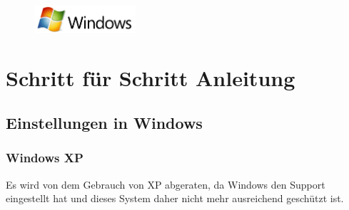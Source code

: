 \documentclass[a4paper,12pt]{scrartcl}
\begin{document}
\newpage
\enlargethispage{20pt}

\begin{figure}[t!]
    \raggedleft
    \vspace{-20pt}
    \includegraphics[height=1cm,keepaspectratio]{Bilder/Windows_logo}
    \vspace{-30pt}
\end{figure}

\section*{Schritt für Schritt Anleitung}
\subsection*{Einstellungen in Windows}
\subsubsection*{Windows XP}
Es wird von dem Gebrauch von XP abgeraten, da Windows den Support eingestellt hat und dieses System daher nicht mehr ausreichend geschützt ist. 
\end{document}

